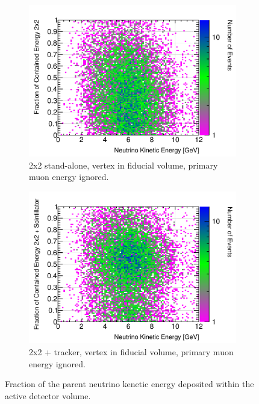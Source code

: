 \documentclass[10pt,a4paper,openany]{article}
\begin{document}
\begin{figure}[htbp]
	\centering
	\begin{subfigure}[b]{0.49\textwidth}
		\centering
		\includegraphics[width=1.0\textwidth]{E_contained_frac_2x2_fiducial_gap_no_prim_muon.png}
		\caption{2x2 stand-alone, vertex in fiducial volume, primary muon energy ignored.}
		\label{}
	\end{subfigure}	
	\hfill
	\begin{subfigure}[b]{0.49\textwidth}
		\centering
		\includegraphics[width=1.0\textwidth]{E_contained_frac_2x2_Scintillator_fiducial_gap_no_prim_muon.png}
		\caption{2x2 + tracker, vertex in fiducial volume, primary muon energy ignored.}
		\label{}
	\end{subfigure}
  \caption{Fraction of the parent neutrino kenetic energy deposited within the active detector volume.}
\end{figure}
\end{document}
